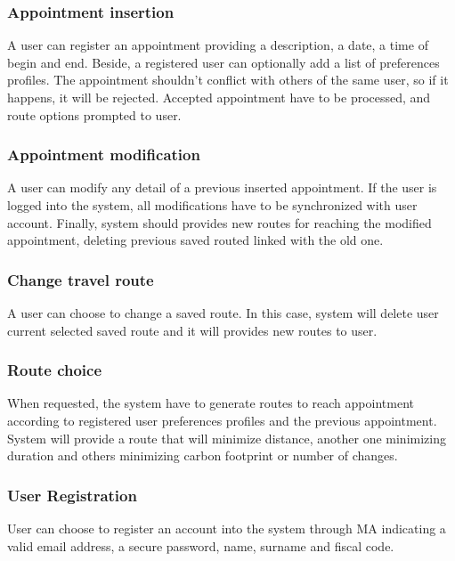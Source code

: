 \subsubsection{Appointment insertion}

A user can register an appointment providing a description, a date, a time of begin and end. Beside, a registered user can optionally add a list of preferences profiles. The appointment shouldn’t conflict with others of the same user, so if it happens, it will be rejected. Accepted appointment have to be processed, and route options prompted to user.

\subsubsection{Appointment modification}

A user can modify any detail of a previous inserted appointment. If the user is logged into the system, all modifications have to be synchronized with user account.
Finally, system should provides new routes for reaching the modified appointment, deleting previous saved routed linked with the old one.

\subsubsection{Change travel route}

A user can choose to change a saved route. In this case, system will delete user current selected saved route and it will provides new routes to user.

\subsubsection{Route choice}

When requested, the system have to generate routes to reach appointment according to registered user preferences profiles and the previous appointment. System will provide a route that will minimize distance, another one minimizing duration and others minimizing carbon footprint or number of changes.

\subsubsection{User Registration}

User can choose to register an account into the system through MA indicating a valid email address, a secure password, name, surname and fiscal code. 

